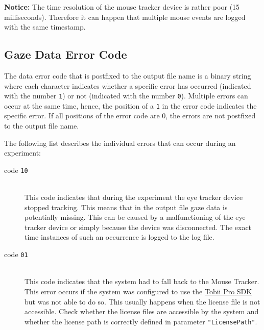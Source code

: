 \documentclass[a4paper,oneside]{book}
\begin{document}
\begin{mdframed}[backgroundcolor=boxbkg]\textbf{\color{orange}Notice:}
    The time resolution of the mouse tracker device is rather poor (15 milliseconds).
    Therefore it can happen that multiple mouse events are logged with the same timestamp.
\end{mdframed}

\subsection{Gaze Data Error Code}
\label{sect.data.error}
The data error code that is postfixed to the output file name is a binary string where each character indicates whether a specific error has occurred (indicated with the number \texttt{1}) or not (indicated with the number \texttt{0}).
Multiple errors can occur at the same time, hence, the position of a \texttt{1} in the error code indicates the specific error.
If all positions of the error code are 0, the errors are not postfixed to the output file name.

The following list describes the individual errors that can occur during an experiment:
\begin{description}
    \item[code \texttt{10}] \hfill \\
        This code indicates that during the experiment the eye tracker device stopped tracking.
        This means that in the output file gaze data is potentially missing.
        This can be caused by a malfunctioning of the eye tracker device or simply because the device was disconnected.
        The exact time instances of such an occurrence is logged to the log file.
    \item[code \texttt{01}] \hfill \\
        This code indicates that the system had to fall back to the Mouse Tracker.
        This error occurs if the system was configured to use the \href{http://developer.tobii.com/tobii-pro-sdk/}{Tobii Pro SDK} but was not able to do so.
        This usually happens when the license file is not accessible.
        Check whether the license files are accessible by the system and whether the license path is correctly defined in parameter \texttt{"LicensePath"}.
\end{description}

\end{document}
